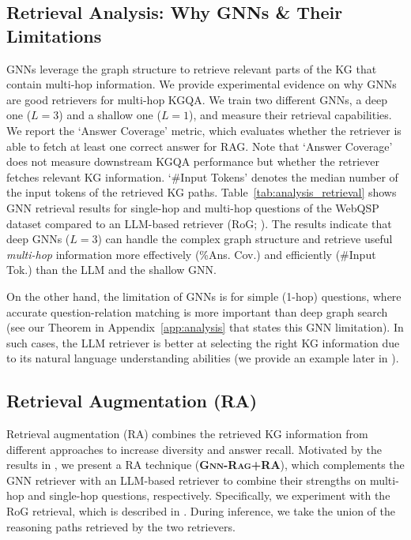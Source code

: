 \documentclass{article}
\newcommand{\gragx}{\textsc{Gnn-Rag}}
\theoremstyle{plain}
\theoremstyle{definition}
\theoremstyle{remark}
\begin{document}
\subsection{Retrieval Analysis: Why GNNs \& Their Limitations} \label{sec:analysis}


GNNs leverage the graph structure to retrieve relevant parts of the KG that contain multi-hop information.  We provide experimental evidence on why GNNs are good retrievers for multi-hop KGQA. 
We train two different GNNs, a deep one ($L=3$) and a shallow one ($L=1$), and measure their retrieval capabilities. We report the `Answer Coverage' metric, which evaluates whether the retriever is able to fetch at least one correct answer for RAG. Note that `Answer Coverage' does not measure downstream KGQA performance but whether the retriever fetches relevant KG information. `\#Input Tokens’ denotes the median number of the input tokens of the retrieved KG paths.
Table~\ref{tab:analysis_retrieval} shows GNN retrieval results for single-hop and multi-hop questions of the WebQSP dataset compared to an LLM-based retriever (RoG; ). The results indicate that deep GNNs ($L=3$) can handle the complex graph structure and retrieve useful \emph{multi-hop} information more effectively (\%Ans. Cov.) and efficiently (\#Input Tok.) than the LLM and the shallow GNN.

On the other hand, the limitation of GNNs is for  simple (1-hop) questions, where accurate question-relation matching is more important than deep graph search (see our Theorem in Appendix~\ref{app:analysis} that states this GNN limitation). In such cases, the LLM retriever is better at selecting the right KG information due to its natural language understanding abilities (we provide an example later in ).



 





\subsection{Retrieval Augmentation (RA)} \label{sec:ret_aug}












Retrieval augmentation (RA) combines the retrieved KG information from different approaches to increase diversity and answer recall. Motivated by the results in , we present a RA technique (\textbf{\gragx+RA}), which complements the GNN retriever with an LLM-based retriever to combine their strengths on multi-hop and single-hop questions, respectively. Specifically, we experiment with the RoG retrieval, which is described in .  During inference, we take the union of the reasoning paths retrieved by the two retrievers.
\end{document}
